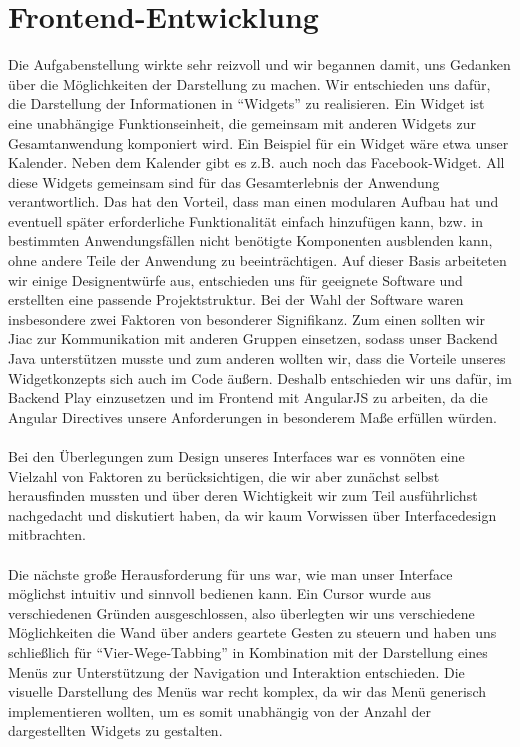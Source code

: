 \documentclass[10pt,a4paper]{report}
\begin{document}
\section{Frontend-Entwicklung}
	Die Aufgabenstellung wirkte sehr reizvoll und wir begannen damit, uns Gedanken über die Möglichkeiten der Darstellung zu machen. Wir entschieden uns dafür, die Darstellung der Informationen in "`Widgets"' zu realisieren. Ein Widget ist eine unabhängige Funktionseinheit, die gemeinsam mit anderen Widgets zur Gesamtanwendung komponiert wird. Ein Beispiel für ein Widget wäre etwa unser Kalender. Neben dem Kalender gibt es z.B. auch noch das Facebook-Widget. All diese Widgets gemeinsam sind für das Gesamterlebnis der Anwendung verantwortlich. Das hat den Vorteil, dass man einen modularen Aufbau hat und eventuell später erforderliche Funktionalität einfach hinzufügen kann, bzw. in bestimmten Anwendungsfällen nicht benötigte Komponenten ausblenden kann, ohne andere Teile der Anwendung zu beeinträchtigen. Auf dieser Basis arbeiteten wir einige Designentwürfe aus, entschieden uns für geeignete Software und erstellten eine passende Projektstruktur. Bei der Wahl der Software waren insbesondere zwei Faktoren von besonderer Signifikanz. Zum einen sollten wir Jiac zur Kommunikation mit anderen Gruppen einsetzen, sodass unser Backend Java unterstützen musste und zum anderen wollten wir, dass die Vorteile unseres Widgetkonzepts sich auch im Code äußern. Deshalb entschieden wir uns dafür, im Backend Play einzusetzen und im Frontend mit AngularJS zu arbeiten, da die Angular Directives unsere Anforderungen in besonderem Maße erfüllen würden.\\\\
	Bei den Überlegungen zum Design unseres Interfaces war es vonnöten eine Vielzahl von Faktoren zu berücksichtigen, die wir aber zunächst selbst herausfinden mussten und über deren Wichtigkeit wir zum Teil ausführlichst nachgedacht und diskutiert haben, da wir kaum Vorwissen über Interfacedesign mitbrachten.\\\\
	Die nächste große Herausforderung für uns war, wie man unser Interface möglichst intuitiv und sinnvoll bedienen kann. Ein Cursor wurde aus verschiedenen Gründen ausgeschlossen, also überlegten wir uns verschiedene Möglichkeiten die Wand über anders geartete Gesten zu steuern und haben uns schließlich für "`Vier-Wege-Tabbing"' in Kombination mit der Darstellung eines Menüs zur Unterstützung der Navigation und Interaktion entschieden. Die visuelle Darstellung des Menüs war recht komplex, da wir das Menü generisch implementieren wollten, um es somit unabhängig von der Anzahl der dargestellten Widgets zu gestalten.\\\\
\end{document}
